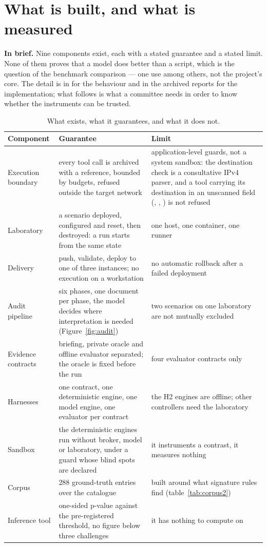 \section{What is built, and what is measured}
\label{sec:construit}

\textbf{In brief.} Nine components exist, each with a stated guarantee and a
stated limit. None of them proves that a model does better than a script, which
is the question of the benchmark comparison --- one use among others, not the
project's core. The detail is in  for the behaviour
and in the archived reports for the implementation; what follows is what a
committee needs in order to know whether the instruments can be trusted.

\begin{table}[tbp]
\centering
\caption{What exists, what it guarantees, and what it does not.}
\label{tab:composants}
\small
\begin{tabularx}{\linewidth}{@{}>{\raggedright\arraybackslash}p{3.2cm}Y>{\raggedright\arraybackslash}p{3.5cm}@{}}
\toprule
Component & Guarantee & Limit \\
\midrule
Execution boundary & every tool call is archived with a reference, bounded by
budgets, refused outside the target network & application-level guards, not a
system sandbox: the destination check is a consultative IPv4 parser, and a tool
carrying its destination in an unscanned field (, ,
) is not refused \\
Laboratory & a scenario deployed, configured and reset, then destroyed: a run
starts from the same state & one host, one container, one runner \\
Delivery & push, validate, deploy to one of three instances; no execution on a
workstation & no automatic rollback after a failed deployment \\
Audit pipeline & six phases, one document per phase, the model decides where
interpretation is needed (Figure~\ref{fig:audit}) & two scenarios on one
laboratory are not mutually excluded \\
Evidence contracts & briefing, private oracle and offline evaluator separated;
the oracle is fixed before the run & four evaluator contracts only \\
Harnesses & one contract, one deterministic engine, one model engine, one evaluator per
contract & the H2 engines are offline; other controllers need the laboratory \\
Sandbox & the deterministic engines run without broker, model or laboratory, under a
guard whose blind spots are declared & it instruments a contrast, it measures
nothing \\
Corpus & 288 ground-truth entries over the catalogue & built around what signature
rules find (table~\ref{tab:corpus2}) \\
Inference tool & one-sided p-value against the pre-registered threshold, no
figure below three challenges & it has nothing to compute on \\
\bottomrule
\end{tabularx}
\end{table}

